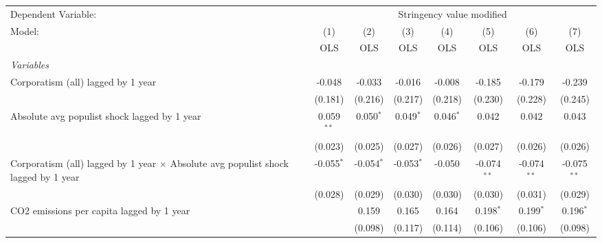 
\begingroup
\centering
\begin{tabular}{lccccccc}
   \toprule
   Dependent Variable: & \multicolumn{7}{c}{Stringency value modified}\\
   Model:                                                                                    & (1)          & (2)          & (3)          & (4)         & (5)           & (6)           & (7)\\  
                                                                                             &  OLS         & OLS          & OLS          & OLS         & OLS           & OLS           & OLS\\  
   \midrule
   \emph{Variables}\\
   Corporatism (all) lagged by 1 year                                                        & -0.048       & -0.033       & -0.016       & -0.008      & -0.185        & -0.179        & -0.239\\   
                                                                                             & (0.181)      & (0.216)      & (0.217)      & (0.218)     & (0.230)       & (0.228)       & (0.245)\\   
   Absolute avg populist shock lagged by 1 year                                              & 0.059$^{**}$ & 0.050$^{*}$  & 0.049$^{*}$  & 0.046$^{*}$ & 0.042         & 0.042         & 0.043\\   
                                                                                             & (0.023)      & (0.025)      & (0.027)      & (0.026)     & (0.027)       & (0.026)       & (0.026)\\   
   Corporatism (all) lagged by 1 year $\times$ Absolute avg populist shock lagged by 1 year  & -0.055$^{*}$ & -0.054$^{*}$ & -0.053$^{*}$ & -0.050      & -0.074$^{**}$ & -0.074$^{**}$ & -0.075$^{**}$\\   
                                                                                             & (0.028)      & (0.029)      & (0.030)      & (0.030)     & (0.030)       & (0.031)       & (0.029)\\   
   CO2 emissions per capita lagged by 1 year                                                 &              & 0.159        & 0.165        & 0.164       & 0.198$^{*}$   & 0.199$^{*}$   & 0.196$^{*}$\\   
                                                                                             &              & (0.098)      & (0.117)      & (0.114)     & (0.106)       & (0.106)       & (0.098)\\   

\end{tabular}
